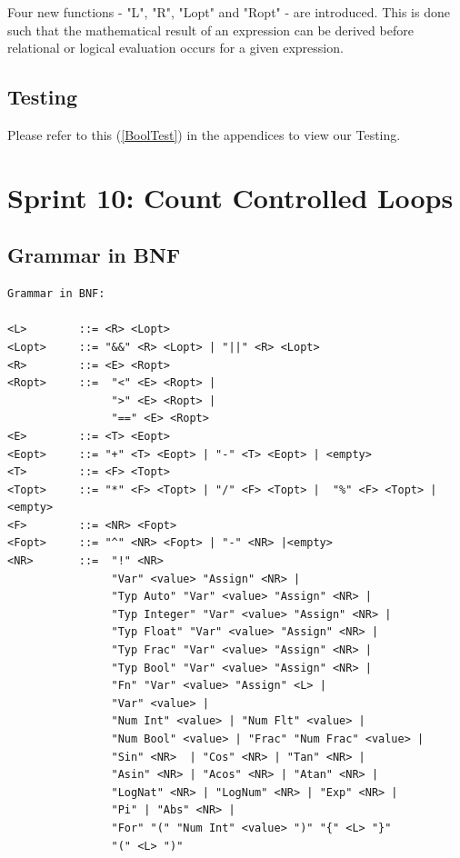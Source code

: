 \documentclass[a4paper, oneside, 11pt]{report}
\begin{document}
Four new functions - "L", "R", "Lopt" and "Ropt" - are introduced. This is done such that the mathematical result of an expression can be derived before relational or logical evaluation occurs for a given expression.

\subsection{Testing}
Please refer to this (\ref{BoolTest}) in the appendices to view our Testing. \\

\section{Sprint 10: Count Controlled Loops}
\subsection{Grammar in BNF}
\begin{verbatim}
Grammar in BNF:

<L>        ::= <R> <Lopt>
<Lopt>     ::= "&&" <R> <Lopt> | "||" <R> <Lopt> 
<R>        ::= <E> <Ropt>
<Ropt>     ::=  "<" <E> <Ropt> | 
                ">" <E> <Ropt> |  
                "==" <E> <Ropt>
<E>        ::= <T> <Eopt>
<Eopt>     ::= "+" <T> <Eopt> | "-" <T> <Eopt> | <empty>
<T>        ::= <F> <Topt>
<Topt>     ::= "*" <F> <Topt> | "/" <F> <Topt> |  "%" <F> <Topt> |<empty>
<F>        ::= <NR> <Fopt>
<Fopt>     ::= "^" <NR> <Fopt> | "-" <NR> |<empty> 
<NR>       ::=  "!" <NR>
                "Var" <value> "Assign" <NR> |
                "Typ Auto" "Var" <value> "Assign" <NR> |
                "Typ Integer" "Var" <value> "Assign" <NR> |
                "Typ Float" "Var" <value> "Assign" <NR> |
                "Typ Frac" "Var" <value> "Assign" <NR> |
                "Typ Bool" "Var" <value> "Assign" <NR> |
                "Fn" "Var" <value> "Assign" <L> |
                "Var" <value> |
                "Num Int" <value> | "Num Flt" <value> |
                "Num Bool" <value> | "Frac" "Num Frac" <value> |
                "Sin" <NR>  | "Cos" <NR> | "Tan" <NR> |
                "Asin" <NR> | "Acos" <NR> | "Atan" <NR> |
                "LogNat" <NR> | "LogNum" <NR> | "Exp" <NR> |
                "Pi" | "Abs" <NR> |
                "For" "(" "Num Int" <value> ")" "{" <L> "}"
                "(" <L> ")"
\end{verbatim}
\end{document}
